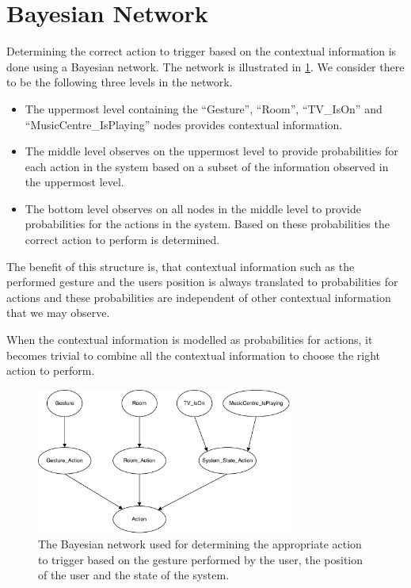 \section{Bayesian Network}
\label{sec:design:bayesian-network}

Determining the correct action to trigger based on the contextual information is done using a Bayesian network. The network is illustrated in \cref{fig:design:bayesian-network:overview}. We consider there to be the following three levels in the network.

\begin{itemize}
\item The uppermost level containing the ``Gesture'', ``Room'', ``TV\_IsOn'' and ``MusicCentre\_IsPlaying'' nodes provides contextual information.
\item The middle level observes on the uppermost level to provide probabilities for each action in the system based on a subset of the information observed in the uppermost level.
\item The bottom level observes on all nodes in the middle level to provide probabilities for the actions in the system. Based on these probabilities the correct action to perform is determined.
\end{itemize}

The benefit of this structure is, that contextual information such as the performed gesture and the users position is always translated to probabilities for actions and these probabilities are independent of other contextual information that we may observe.

When the contextual information is modelled as probabilities for actions, it becomes trivial to combine all the contextual information to choose the right action to perform.

\begin{figure}[h!]
\centering
\includegraphics[width=0.75\textwidth]{images/bayesian-network}
\caption{The Bayesian network used for determining the appropriate action to trigger based on the gesture performed by the user, the position of the user and the state of the system.}
\label{fig:design:bayesian-network:overview}
\end{figure}

